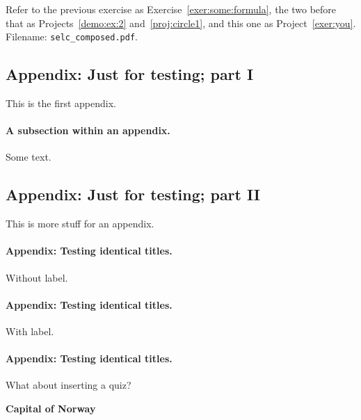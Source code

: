 \documentclass[%
oneside,                 %
final,                   %
10pt]{article}
\newenvironment{doconcequiz}{}{}
\newcounter{doconcequizcounter}
\newenvironment{doconceexercise}{}{}
\theoremstyle{definition}
\begin{document}
\begin{enumerate}
\begin{doconceexercise}
\label{exer:you}

Refer to the previous exercise as Exercise~\vref{exer:some:formula},
the two before that as Projects~\vref{demo:ex:2} and~\vref{proj:circle1},
and this one as Project~\vref{exer:you}.
\noindent Filename: \Verb!selc_composed.pdf!.

\end{doconceexercise}




\subsection{Appendix: Just for testing; part I}
\label{app1}

This is the first appendix.

\paragraph{A subsection within an appendix.}
Some text.

\subsection{Appendix: Just for testing; part II}
\label{app2}

This is more stuff for an appendix.

\paragraph{Appendix: Testing identical titles.}
Without label.

\paragraph{Appendix: Testing identical titles.}
\label{test:title:id1}

With label.

\paragraph{Appendix: Testing identical titles.}
\label{test:title:id2}

What about inserting a quiz?


\begin{doconcequiz}
\label{quiz:2}


\noindent\textbf{\large Capital of Norway}

\end{doconcequiz}
\end{enumerate}
\end{document}

